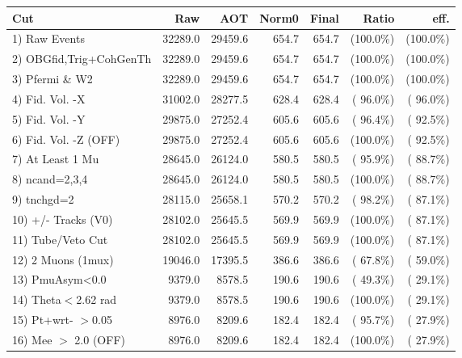  \begin{table}[h!]\centering
 \begin{tabular}{||l||r|r|r|r|r|r||}
 \hline
 \hline
 Cut & Raw & AOT & Norm0 & Final & Ratio & eff.       \\
 \hline
  1) Raw Events           &      32289.0 &      29459.6 &        654.7 &        654.7 & (100.0\%) & (100.0\%) \\
  2) OBGfid,Trig+CohGenTh &      32289.0 &      29459.6 &        654.7 &        654.7 & (100.0\%) & (100.0\%) \\
  3) Pfermi \& W2         &      32289.0 &      29459.6 &        654.7 &        654.7 & (100.0\%) & (100.0\%) \\
  4) Fid. Vol. -X         &      31002.0 &      28277.5 &        628.4 &        628.4 & ( 96.0\%) & ( 96.0\%) \\
  5) Fid. Vol. -Y         &      29875.0 &      27252.4 &        605.6 &        605.6 & ( 96.4\%) & ( 92.5\%) \\
  6) Fid. Vol. -Z (OFF)   &      29875.0 &      27252.4 &        605.6 &        605.6 & (100.0\%) & ( 92.5\%) \\
  7) At Least 1 Mu        &      28645.0 &      26124.0 &        580.5 &        580.5 & ( 95.9\%) & ( 88.7\%) \\
  8) ncand=2,3,4          &      28645.0 &      26124.0 &        580.5 &        580.5 & (100.0\%) & ( 88.7\%) \\
  9) tnchgd=2             &      28115.0 &      25658.1 &        570.2 &        570.2 & ( 98.2\%) & ( 87.1\%) \\
 10) +/- Tracks (V0)      &      28102.0 &      25645.5 &        569.9 &        569.9 & (100.0\%) & ( 87.1\%) \\
 11) Tube/Veto Cut        &      28102.0 &      25645.5 &        569.9 &        569.9 & (100.0\%) & ( 87.1\%) \\
 12) 2 Muons (1mux)       &      19046.0 &      17395.5 &        386.6 &        386.6 & ( 67.8\%) & ( 59.0\%) \\
 13) PmuAsym<0.0          &       9379.0 &       8578.5 &        190.6 &        190.6 & ( 49.3\%) & ( 29.1\%) \\
 14) Theta$<$2.62 rad     &       9379.0 &       8578.5 &        190.6 &        190.6 & (100.0\%) & ( 29.1\%) \\
 15) Pt+wrt- $>$0.05      &       8976.0 &       8209.6 &        182.4 &        182.4 & ( 95.7\%) & ( 27.9\%) \\
 16) Mee $>$ 2.0  (OFF)   &       8976.0 &       8209.6 &        182.4 &        182.4 & (100.0\%) & ( 27.9\%) \\

\end{tabular}
\end{table}

